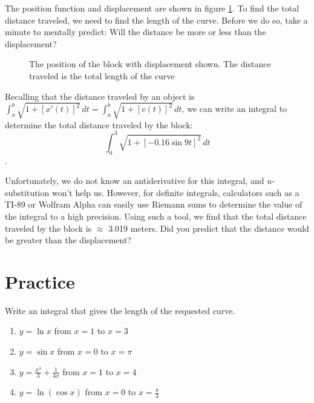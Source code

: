 The position function and displacement are shown in figure 
\ref{fig:block}. To find the total distance traveled, we need to find 
the length of the curve. Before we do so, take a minute to mentally 
predict: Will the distance be more or less than the displacement?

\begin{figure}[htbp]
\centering
    \caption{The position of the block with displacement shown. The 
    distance traveled is the total length of the curve}
    \label{fig:block}
\end{figure}

Recalling that the distance traveled by an object is 
$\int_a^b \sqrt{1+[x'(t)]^2}\,dt = \int_a^b \sqrt{1 + [v(t)]^2}\,dt$, 
we can write an integral to determine the total distance traveled by the block:
$$\int_0^3 \sqrt{1 + [-0.16\sin{9t}]^2}\,dt$$.

Unfortunately, we do not know an antiderivative for this integral, and 
$u$-substitution won't help us. However, for definite integrals, 
calculators such as a TI-89 or Wolfram Alpha can easily use Riemann 
sums to determine the value of the integral to a high precision. Using 
such a tool, we find that the total distance traveled by the block is 
$\approx$ 3.019 meters. Did you predict that the distance would be 
greater than the displacement?

\section{Practice}

\begin{Exercise}[label=length1]
Write an integral that gives the length of the requested curve.
	\begin{enumerate}
	\item $y = \ln{x}$ from $x = 1$ to $x = 3$
	\item $y = \sin{x}$ from $x = 0$ to $x = \pi$
	\item $y = \frac{x^3}{3} + \frac{1}{4x}$ from $x = 1$ to $x = 4$
	\item $y = \ln{(\cos{x})}$ from $x = 0$ to $x = \frac{\pi}{3}$
	\end{enumerate}	 
\end{Exercise}


